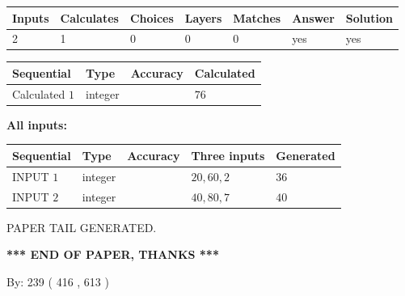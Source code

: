 \documentclass{ctexart}
\begin{document}
   
\noindent\begin{tabular}{|l|l|l|l|l|l|l|}
 \hline
Inputs & Calculates & Choices & Layers & Matches & Answer & Solution \\ \hline
 2  & 
 1  & 
 0
  & 
 0  & 
 0  & 
  yes & 
  yes 
  \\ \hline
 \end{tabular}
   
   
   
   
\noindent{}
   
   
  
  
\noindent\begin{tabular}{|l|l|l|l|}
\hline
 Sequential & Type & Accuracy & Calculated \\ 
\hline
 
 
  Calculated $  1 $ & integer &  & 
  $ 76 $ 
 \\  \hline  
 \end{tabular}
   
   
   
   
\noindent\vspace{0.1in}\hspace{-0.08in} {\textbf{\Large{All inputs: }}}
   
   
  
  
\noindent\begin{tabular}{|l|l|l|l|l|}
\hline
 Sequential & Type & Accuracy & Three inputs & Generated \\ 
\hline
 
 
  INPUT $  1 $ & integer &  & $
 20
 , 
 60
 , 
 2
 $ & $ 36 $ 
 \\  \hline  
 
 
  INPUT $  2 $ & integer &  & $
 40
 , 
 80
 , 
 7
 $ & $ 40 $ 
 \\  \hline  
 \end{tabular}
   
   
   
   
   
   
 \vspace{0.2in}
 
   
   
\vspace{2.0in} PAPER TAIL GENERATED.
   
   
   
   
\vspace{1.0in} 
{\textbf{\large{ *** END OF PAPER, THANKS *** }}} 
   
   
\hspace{1.0in} By: 
 239 ( 416 ,  613 )
   
\end{document}
